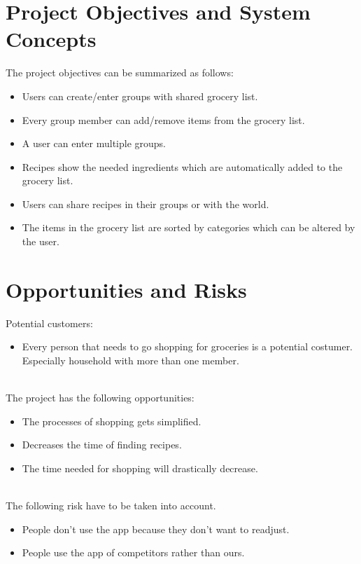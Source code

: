 \documentclass[12pt]{article}
\theoremstyle{definition}
\newenvironment{textblock}{%
   \setlength{\parindent}{0pt}
   \large
   
}{}
\begin{document}
\pagebreak

\section{Project Objectives and System Concepts}

\begin{textblock}
The project objectives can be summarized as follows:
\begin{itemize}
\item Users can create/enter groups with shared grocery list.
\item Every group member can add/remove items from the grocery list.
\item A user can enter multiple groups.
\item Recipes show the needed ingredients which are automatically added to the grocery list.
\item Users can share recipes in their groups or with the world.
\item The items in the grocery list are sorted by categories which can be altered by the user.
\end{itemize}
\end{textblock}

\pagebreak

\section{Opportunities and Risks}

\begin{textblock}
Potential customers:
\begin{itemize}
\item Every person that needs to go shopping for groceries is a potential costumer.\\
Especially household with more than one member.\\\\
\end{itemize}

The project has the following opportunities:
\begin{itemize}
\item The processes of shopping gets simplified.
\item Decreases the time of finding recipes.
\item The time needed for shopping will drastically decrease.\\\\
\end{itemize}

The following risk have to be taken into account.
\begin{itemize}
\item People don’t use the app because they don’t want to readjust.
\item People use the app of competitors rather than ours.
\end{itemize}
\end{textblock}
\end{document}
